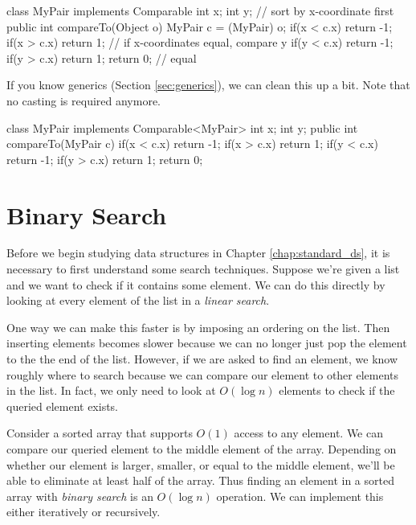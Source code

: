 \begin{mylstlisting}
class MyPair implements Comparable {
	int x;
	int y;
    // sort by x-coordinate first
	public int compareTo(Object o) {
		MyPair c = (MyPair) o;
		if(x < c.x) return -1;
		if(x > c.x) return 1;
		// if x-coordinates equal, compare y
		if(y < c.x) return -1;
		if(y > c.x) return 1;
		return 0; // equal
	}
}
\end{mylstlisting}

If you know generics (Section \ref{sec:generics}), we can clean this up a bit. Note that no casting is required anymore.

\begin{mylstlisting}
class MyPair implements Comparable<MyPair> {
	int x;
	int y;
	public int compareTo(MyPair c) {
		if(x < c.x) return -1;
		if(x > c.x) return 1;
		if(y < c.x) return -1;
		if(y > c.x) return 1;
		return 0;
	}
}
\end{mylstlisting}

\section{Binary Search}

Before we begin studying data structures in Chapter \ref{chap:standard_ds}, it is necessary to first understand some search techniques. Suppose we're given a list and we want to check if it contains some element. We can do this directly by looking at every element of the list in a \emph{linear search}.

One way we can make this faster is by imposing an ordering on the list. Then inserting elements becomes slower because we can no longer just pop the element to the the end of the list. However, if we are asked to find an element, we know roughly where to search because we can compare our element to other elements in the list. In fact, we only need to look at $O(\log n)$ elements to check if the queried element exists.

Consider a sorted array that supports $O(1)$ access to any element. We can compare our queried element to the middle element of the array. Depending on whether our element is larger, smaller, or equal to the middle element, we'll be able to eliminate at least half of the array. Thus finding an element in a sorted array with \emph{binary search} is an $O(\log{n})$ operation. We can implement this either iteratively or recursively.

